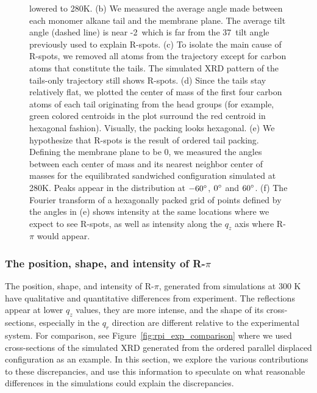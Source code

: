 \documentclass[journal=jpcbfk,manuscript=article]{achemso}
\begin{document}
\begin{figure}[!htb]
{      lowered to 280K. (b) We measured the average angle made between each monomer 
      alkane tail and the membrane plane. The average tilt angle (dashed line) is 
      near -2\degree~which is far from the 37\degree~tilt angle previously used to
      explain R-spots. (c) To isolate the main cause of R-spots, we removed all atoms
      from the trajectory except for carbon atoms that constitute the tails. The
      simulated XRD pattern of the tails-only trajectory still shows R-spots. (d)
      Since the tails stay relatively flat, we plotted the center of mass of the first
      four carbon atoms of each tail originating from the head groups (for example,
      green colored centroids in the plot surround the red centroid in hexagonal fashion).
      Visually, the packing looks hexagonal. (e) We hypothesize
      that R-spots is the result of ordered tail packing. Defining
      the membrane plane to be 0\degree, we measured the angles between each center of 
      mass and its nearest neighbor center of masses for the equilibrated 
      sandwiched configuration simulated at 280K. Peaks appear in the distribution at 
      $-60\degree$, $0\degree$ and $60\degree$. (f) The Fourier transform of a hexagonally
      packed grid of points defined by the angles in (e) shows intensity at the same
      locations where we expect to see R-spots, as well as intensity along the $q_z$ axis
      where R-$\pi$ would appear.}~\label{fig:tail_packing}
  \end{figure}  

  \subsubsection{The position, shape, and intensity of R-$\pi$}\label{section:rpi}

  The position, shape, and intensity of R-$\pi$, generated from simulations at
  300 K have qualitative and quantitative differences from experiment.
  The reflections appear at lower $q_z$ values, they
  are more intense, and the shape of its cross-sections, especially in the $q_r$
  direction are different relative to the experimental system.  For comparison,
  see Figure~\ref{fig:rpi_exp_comparison} where we used cross-sections of the
  simulated XRD generated from the ordered parallel displaced configuration as an
  example. In this section, we explore the various contributions to these
  discrepancies, and use this information to speculate on what reasonable
  differences in the simulations could explain the discrepancies.
  
\end{document}
